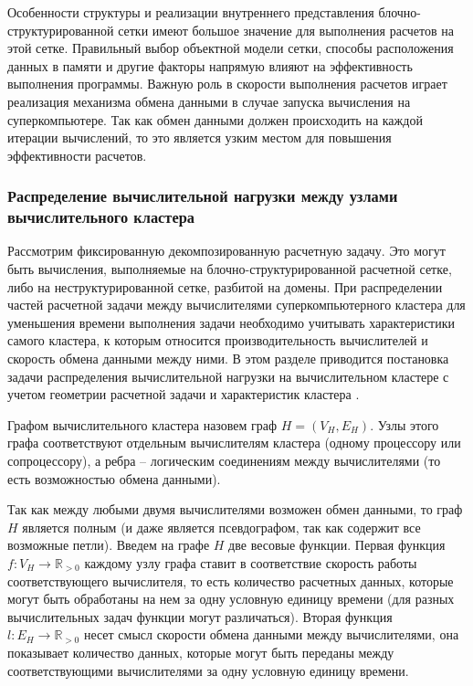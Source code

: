Особенности структуры и реализации внутреннего представления блочно-структурированной сетки имеют большое значение для выполнения расчетов на этой сетке.
Правильный выбор объектной модели сетки, способы расположения данных в памяти и другие факторы напрямую влияют на эффективность выполнения программы.
Важную роль в скорости выполнения расчетов играет реализация механизма обмена данными в случае запуска вычисления на суперкомпьютере.
Так как обмен данными должен происходить на каждой итерации вычислений, то это является узким местом для повышения эффективности расчетов.

\subsubsection{Распределение вычислительной нагрузки между узлами вычислительного кластера}\label{sec:text_2_getero}

Рассмотрим фиксированную декомпозированную расчетную задачу.
Это могут быть вычисления, выполняемые на блочно-структурированной расчетной сетке, либо на неструктурированной сетке, разбитой на домены.
При распределении частей расчетной задачи между вычислителями суперкомпьютерного кластера для уменьшения времени выполнения задачи необходимо учитывать характеристики самого кластера, к которым относится производительность вычислителей и скорость обмена данными между ними.
В этом разделе приводится постановка задачи распределения вычислительной нагрузки на вычислительном кластере с учетом геометрии расчетной задачи и характеристик кластера \cite{Rybakov2018Distr,Rybakov2017Part}.

\begin{definition}
Графом вычислительного кластера назовем граф $H = (V_H, E_H)$.
Узлы этого графа соответствуют отдельным вычислителям кластера (одному процессору или сопроцессору), а ребра -- логическим соединениям между вычислителями (то есть возможностью обмена данными).
\end{definition}

Так как между любыми двумя вычислителями возможен обмен данными, то граф $H$ является полным (и даже является псевдографом, так как содержит все возможные петли).
Введем на графе $H$ две весовые функции.
Первая функция $f: V_H \rightarrow \mathbb{R}_{> 0}$ каждому узлу графа ставит в соответствие скорость работы соответствующего вычислителя, то есть количество расчетных данных, которые могут быть обработаны на нем за одну условную единицу времени (для разных вычислительных задач функции могут различаться).
Вторая функция $l: E_H \rightarrow \mathbb{R}_{> 0}$ несет смысл скорости обмена данными между вычислителями, она показывает количество данных, которые могут быть переданы между соответствующими вычислителями за одну условную единицу времени.

